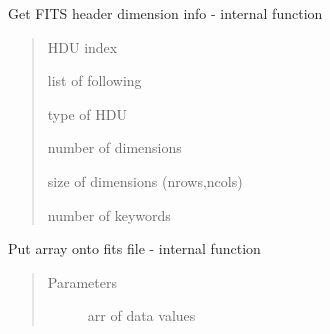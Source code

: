 \documentclass[letterpaper,10pt,english]{sphinxmanual}
\begin{document}
\begin{fulllineitems}
\label{\detokenize{qfits_functions:qfits.fitshduinfo}}
Get FITS header dimension info - internal function
\begin{quote}\begin{description}
\item[{Parameters}] \leavevmode
{} \textendash{} HDU index

\item[{Returns}] \leavevmode

\begin{DUlineblock}{0em}
\item[] list of following
\item[]
\begin{DUlineblock}{\DUlineblockindent}
\item[]     type of HDU
\item[]       number of dimensions
\item[]       size of dimensions (nrows,ncols)
\item[]       number of keywords
\end{DUlineblock}
\end{DUlineblock}


\end{description}\end{quote}

\end{fulllineitems}


\begin{fulllineitems}
\label{\detokenize{qfits_functions:qfits.fitsparr}}
Put array onto fits file - internal function
\begin{quote}\begin{description}
\item[{Parameters}] \leavevmode
{} \textendash{} arr of data values

\end{description}\end{quote}

\end{fulllineitems}
\end{document}
